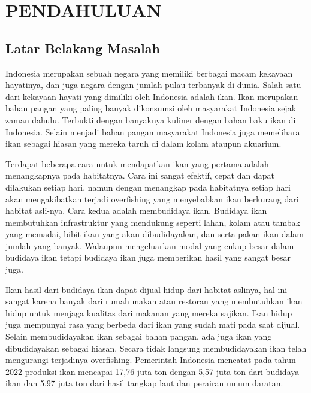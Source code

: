 
\chapter{PENDAHULUAN}

\section{Latar Belakang Masalah}

Indonesia merupakan sebuah negara yang memiliki berbagai macam 
kekayaan hayatinya, dan juga negara dengan jumlah pulau terbanyak di dunia. 
Salah satu dari kekayaan hayati yang dimiliki oleh Indonesia adalah ikan. Ikan 
merupakan bahan pangan yang paling banyak dikonsumsi oleh masyarakat 
Indonesia sejak zaman dahulu. Terbukti dengan banyaknya kuliner dengan bahan 
baku ikan di Indonesia. Selain menjadi bahan pangan masyarakat Indonesia juga 
memelihara ikan sebagai hiasan yang mereka taruh di dalam kolam ataupun akuarium.

Terdapat beberapa cara untuk mendapatkan ikan yang pertama adalah menangkapnya pada habitatnya. 
Cara ini sangat efektif, cepat dan dapat dilakukan setiap hari, namun dengan menangkap 
pada habitatnya setiap hari akan mengakibatkan terjadi overfishing yang menyebabkan ikan 
berkurang dari habitat asli-nya. Cara kedua adalah membudidaya ikan. Budidaya ikan membutuhkan 
infrastruktur yang mendukung seperti lahan, kolam atau tambak yang memadai, bibit ikan yang akan 
dibudidayakan, dan serta pakan ikan dalam jumlah yang banyak. Walaupun mengeluarkan modal yang cukup besar dalam budidaya ikan tetapi budidaya ikan juga memberikan hasil yang sangat besar juga. 

Ikan hasil dari budidaya ikan dapat dijual hidup dari habitat aslinya, hal ini sangat karena banyak dari rumah makan atau restoran yang membutuhkan ikan hidup 
untuk menjaga kualitas dari makanan yang mereka sajikan. Ikan hidup juga mempunyai rasa yang berbeda dari ikan yang sudah 
mati pada saat dijual. Selain membudidayakan ikan sebagai bahan pangan, ada juga ikan yang dibudidayakan sebagai hiasan. 
Secara tidak langsung membudidayakan ikan telah mengurangi terjadinya overfishing. 
Pemerintah Indonesia mencatat pada tahun 2022 produksi ikan mencapai 17,76 juta ton dengan 5,57 juta ton dari budidaya ikan dan 5,97 juta ton dari hasil tangkap laut dan perairan umum daratan.

